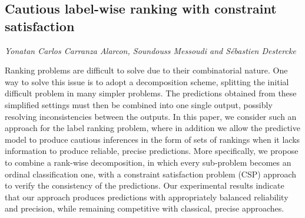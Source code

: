 \documentclass[../booklet.tex]{subfiles}
\begin{document}
\subsection[Cautious label-wise ranking with constraint satisfaction. {\it Yonatan Carlos Carranza Alarcon, Soundouss Messoudi and Sébastien Destercke}]{Cautious label-wise ranking with constraint satisfaction}
  

\begin{center}
  {\it Yonatan Carlos Carranza Alarcon, Soundouss Messoudi and Sébastien Destercke}
\end{center}



Ranking problems are difficult to solve due to their combinatorial nature. One way to solve this issue is to adopt a decomposition scheme, splitting the initial difficult problem in many simpler problems. The predictions obtained from these simplified settings must then be combined into one single output, possibly resolving inconsistencies between the outputs. In this paper, we consider such an approach for the label ranking problem, where in addition we allow the predictive model to produce cautious inferences in the form of sets of rankings when it lacks information to produce reliable, precise predictions. More specifically, we propose to combine a rank-wise decomposition, in which every sub-problem becomes an ordinal classification one, with a constraint satisfaction problem (CSP) approach to verify the consistency of the predictions. Our experimental results indicate that our approach produces predictions with appropriately balanced reliability and precision, while remaining competitive with classical, precise approaches.
\end{document}

